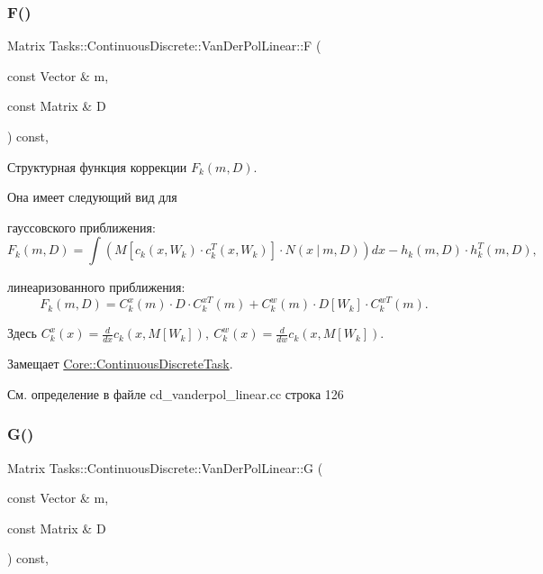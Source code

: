 \subsubsection{\texorpdfstring{F()}{F()}}
{\footnotesize\ttfamily Matrix Tasks\+::\+Continuous\+Discrete\+::\+Van\+Der\+Pol\+Linear\+::F (\begin{DoxyParamCaption}\item[{const Vector \&}]{m,  }\item[{const Matrix \&}]{D }\end{DoxyParamCaption}) const\hspace{0.3cm}{\ttfamily [override]}, {\ttfamily [virtual]}}



Структурная функция коррекции $F_k(m, D)$. 

Она имеет следующий вид для


\begin{DoxyItemize}
\item гауссовского приближения\+: \[F_k(m, D) = \int (M[c_k(x,W_k)\cdot c_k^T(x, W_k)] \cdot N(x\ |\ m,D))dx - h_k(m,D)\cdot h_k^T(m,D),\]
\item линеаризованного приближения\+: \[F_k(m, D) = C_k^x(m)\cdot D\cdot C_k^{xT}(m) + C_k^w(m)\cdot D[W_k]\cdot C_k^{wT}(m).\]
\end{DoxyItemize}

Здесь $C_k^x(x) = \frac{d}{dx} c_k(x, M[W_k]),\ C_k^w(x) = \frac{d}{dw} c_k(x, M[W_k])$. 

Замещает \hyperlink{class_core_1_1_continuous_discrete_task_a08947ea4d4eb819e0e8530e682a1a377}{Core\+::\+Continuous\+Discrete\+Task}.



См. определение в файле cd\+\_\+vanderpol\+\_\+linear.\+cc строка 126

\hypertarget{class_tasks_1_1_continuous_discrete_1_1_van_der_pol_linear_aad1f3c80a043157b90ba0b55ba2390b1}{}\label{class_tasks_1_1_continuous_discrete_1_1_van_der_pol_linear_aad1f3c80a043157b90ba0b55ba2390b1} 
\subsubsection{\texorpdfstring{G()}{G()}}
{\footnotesize\ttfamily Matrix Tasks\+::\+Continuous\+Discrete\+::\+Van\+Der\+Pol\+Linear\+::G (\begin{DoxyParamCaption}\item[{const Vector \&}]{m,  }\item[{const Matrix \&}]{D }\end{DoxyParamCaption}) const\hspace{0.3cm}{\ttfamily [override]}, {\ttfamily [virtual]}}



